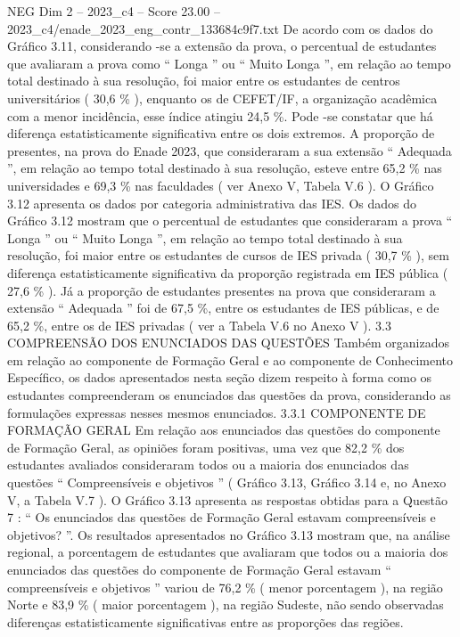 \begin{textsample}{NEG Dim 2 – 2023\_c4 – Score 23.00 – 2023\_c4/enade\_2023\_eng\_contr\_133684c9f7.txt}
De acordo com os dados do Gráfico 3.11, considerando -se a extensão da prova, o percentual de estudantes que avaliaram a prova como “ Longa ” ou “ Muito Longa ”, em relação ao tempo total destinado à sua resolução, foi maior entre os estudantes de centros universitários ( 30,6 \% ), enquanto os de CEFET/IF, a organização acadêmica com a menor incidência, esse índice atingiu 24,5 \%.
Pode -se constatar que há diferença estatisticamente significativa entre os dois extremos.
A proporção de presentes, na prova do Enade 2023, que consideraram a sua extensão “ Adequada ”, em relação ao tempo total destinado à sua resolução, esteve entre 65,2 \% nas universidades e 69,3 \% nas faculdades ( ver Anexo V, Tabela V.6 ).
O Gráfico 3.12 apresenta os dados por categoria administrativa das IES.
Os dados do Gráfico 3.12 mostram que o percentual de estudantes que consideraram a prova “ Longa ” ou “ Muito Longa ”, em relação ao tempo total destinado à sua resolução, foi maior entre os estudantes de cursos de IES privada ( 30,7 \% ), sem diferença estatisticamente significativa da proporção registrada em IES pública ( 27,6 \% ).
Já a proporção de estudantes presentes na prova que consideraram a extensão “ Adequada ” foi de 67,5 \%, entre os estudantes de IES públicas, e de 65,2 \%, entre os de IES privadas ( ver a Tabela V.6 no Anexo V ). 3.3 COMPREENSÃO DOS ENUNCIADOS DAS QUESTÕES Também organizados em relação ao componente de Formação Geral e ao componente de Conhecimento Específico, os dados apresentados nesta seção dizem respeito à forma como os estudantes compreenderam os enunciados das questões da prova, considerando as formulações expressas nesses mesmos enunciados. 3.3.1 COMPONENTE DE FORMAÇÃO GERAL Em relação aos enunciados das questões do componente de Formação Geral, as opiniões foram positivas, uma vez que 82,2 \% dos estudantes avaliados consideraram todos ou a maioria dos enunciados das questões “ Compreensíveis e objetivos ” ( Gráfico 3.13, Gráfico 3.14 e, no Anexo V, a Tabela V.7 ).
O Gráfico 3.13 apresenta as respostas obtidas para a Questão 7 : “ Os enunciados das questões de Formação Geral estavam compreensíveis e objetivos? ”.
Os resultados apresentados no Gráfico 3.13 mostram que, na análise regional, a porcentagem de estudantes que avaliaram que todos ou a maioria dos enunciados das questões do componente de Formação Geral estavam “ compreensíveis e objetivos ” variou de 76,2 \% ( menor porcentagem ), na região Norte e 83,9 \% ( maior porcentagem ), na região Sudeste, não sendo observadas diferenças estatisticamente significativas entre as proporções das regiões.

\end{textsample}
